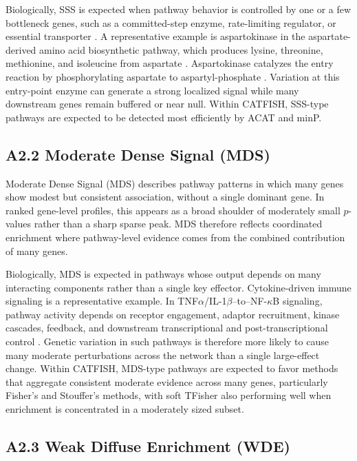 \documentclass[unnumsec,webpdf,contemporary,large]{oup-authoring-template}%
\theoremstyle{thmstyleone}%
\theoremstyle{thmstyletwo}%
\theoremstyle{thmstylethree}%
\begin{document}
\begin{appendices}
Biologically, SSS is expected when pathway behavior is controlled by one or a few bottleneck genes, such as a committed-step enzyme, rate-limiting regulator, or essential transporter \citep{MorenoSanchez2008, Naz2023, Tanner2018, Song2020}. A representative example is aspartokinase in the aspartate-derived amino acid biosynthetic pathway, which produces lysine, threonine, methionine, and isoleucine from aspartate \citep{Galili2011}. Aspartokinase catalyzes the entry reaction by phosphorylating aspartate to aspartyl-phosphate \citep{Hasenoehrl2019}. Variation at this entry-point enzyme can generate a strong localized signal while many downstream genes remain buffered or near null. Within CATFISH, SSS-type pathways are expected to be detected most efficiently by ACAT and minP.

\subsection{A2.2 Moderate Dense Signal (MDS)}

Moderate Dense Signal (MDS) describes pathway patterns in which many genes show modest but consistent association, without a single dominant gene. In ranked gene-level profiles, this appears as a broad shoulder of moderately small \(p\)-values rather than a sharp sparse peak. MDS therefore reflects coordinated enrichment where pathway-level evidence comes from the combined contribution of many genes.

Biologically, MDS is expected in pathways whose output depends on many interacting components rather than a single key effector. Cytokine-driven immune signaling is a representative example. In TNF\(\alpha\)/IL-1\(\beta\)--to--NF-\(\kappa\)B signaling, pathway activity depends on receptor engagement, adaptor recruitment, kinase cascades, feedback, and downstream transcriptional and post-transcriptional control \citep{Jiang2021CytoSig, Megha2021Inflammation, Verstrepen2008NFkB, vanLoo2011NFkB, Cargnello2011MAPK}. Genetic variation in such pathways is therefore more likely to cause many moderate perturbations across the network than a single large-effect change. Within CATFISH, MDS-type pathways are expected to favor methods that aggregate consistent moderate evidence across many genes, particularly Fisher's and Stouffer's methods, with soft TFisher also performing well when enrichment is concentrated in a moderately sized subset.

\subsection{A2.3 Weak Diffuse Enrichment (WDE)}


\end{appendices}
\end{document}
